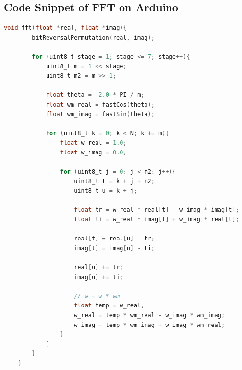 \newpage
\subsection{Code Snippet of FFT on Arduino}
\begin{lstlisting}[style=ArduinoStyle, language=C, caption={FFT Function}, label={fft}]
	void fft(float *real, float *imag){
		bitReversalPermutation(real, imag);
		
		for (uint8_t stage = 1; stage <= 7; stage++){
			uint8_t m = 1 << stage;
			uint8_t m2 = m >> 1;
			
			float theta = -2.0 * PI / m;
			float wm_real = fastCos(theta);
			float wm_imag = fastSin(theta);
			
			for (uint8_t k = 0; k < N; k += m){
				float w_real = 1.0;
				float w_imag = 0.0;
				
				for (uint8_t j = 0; j < m2; j++){
					uint8_t t = k + j + m2;
					uint8_t u = k + j;
					
					float tr = w_real * real[t] - w_imag * imag[t];
					float ti = w_real * imag[t] + w_imag * real[t];
					
					real[t] = real[u] - tr;
					imag[t] = imag[u] - ti;
					
					real[u] += tr;
					imag[u] += ti;
					
					// w = w * wm
					float temp = w_real;
					w_real = temp * wm_real - w_imag * wm_imag;
					w_imag = temp * wm_imag + w_imag * wm_real;
				}
			}
		}
	}
\end{lstlisting}
